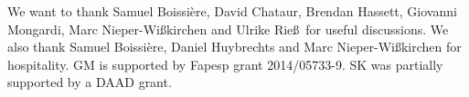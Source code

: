 \documentclass[a4paper]{article}
\begin{document}

%
%



%



\appendix

\begin{acknowledgements}
We want to thank Samuel Boissi\`ere, David Chataur, Brendan Hassett, Giovanni Mongardi, Marc Nieper-Wi\ss kirchen and Ulrike Rie\ss\ for useful discussions.
We also thank Samuel Boissi\`ere, Daniel Huybrechts and Marc Nieper-Wi\ss kirchen for hospitality.
GM is supported by Fapesp grant 2014/05733-9. SK was partially supported by a DAAD grant.
\end{acknowledgements}

\end{document}
